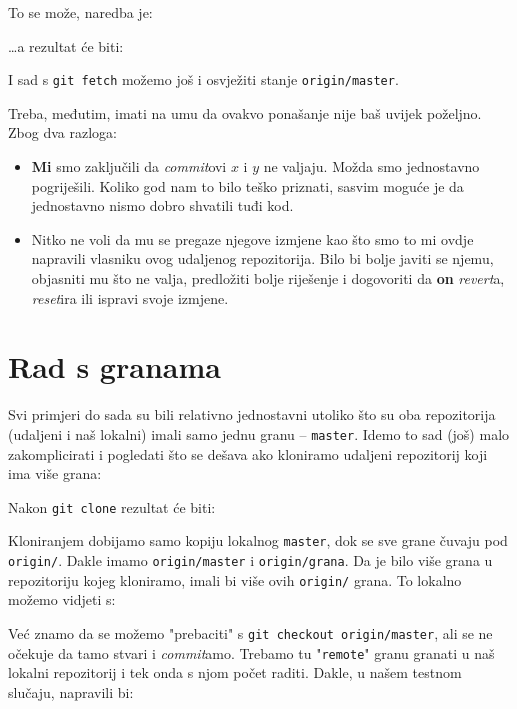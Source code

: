 To se može, naredba je:


\dots{}a rezultat će biti:



I sad s \verb+git fetch+ možemo još i osvježiti stanje \verb+origin/master+.

Treba, međutim, imati na umu da ovakvo ponašanje nije baš uvijek poželjno. 
Zbog dva razloga:

\begin{itemize}
	\item \textbf{Mi} smo zaključili da \emph{commit}ovi $x$ i $y$ ne valjaju. Možda smo jednostavno pogriješili. Koliko god nam to bilo teško priznati, sasvim moguće je da jednostavno nismo dobro shvatili tuđi kod.
	\item Nitko ne voli da mu se pregaze njegove izmjene kao što smo to mi ovdje napravili vlasniku ovog udaljenog repozitorija. Bilo bi bolje javiti se njemu, objasniti mu što ne valja, predložiti bolje riješenje i dogovoriti da \textbf{on} \emph{revert}a, \emph{reset}ira ili ispravi svoje izmjene.
\end{itemize}

\section*{Rad s granama}

Svi primjeri do sada su bili relativno jednostavni utoliko što su oba repozitorija (udaljeni i naš lokalni) imali samo jednu granu -- \verb+master+.
Idemo to sad (još) malo zakomplicirati i pogledati što se dešava ako kloniramo udaljeni repozitorij koji ima više grana:

Nakon \verb+git clone+ rezultat će biti:



Kloniranjem dobijamo samo kopiju lokalnog \verb+master+, dok se sve grane čuvaju pod \verb+origin/+. Dakle imamo \verb+origin/master+ i \verb+origin/grana+.
Da je bilo više grana u repozitoriju kojeg kloniramo, imali bi više ovih \verb+origin/+ grana.
To lokalno možemo vidjeti s:



Već znamo da se možemo "prebaciti" s \verb+git checkout origin/master+, ali se ne očekuje da tamo stvari i \emph{commit}amo.
Trebamo tu "\verb+remote+" granu granati u naš lokalni repozitorij i tek onda s njom počet raditi.
Dakle, u našem testnom slučaju, napravili bi:

